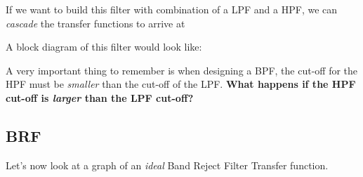 \documentclass{handout}
\begin{document}
If we want to build this filter with combination of a LPF and a HPF, we can {\em cascade} the transfer functions to arrive at


A block diagram of this filter would look like:


A very important thing to remember is when designing a BPF, the cut-off for the HPF must be {\em smaller} than the cut-off of the LPF.  \textbf{What happens if the HPF cut-off is {\em larger} than the LPF cut-off?}  

\subsection{BRF}
Let's now look at a graph of an {\em ideal} Band Reject Filter Transfer function.

\end{document}
